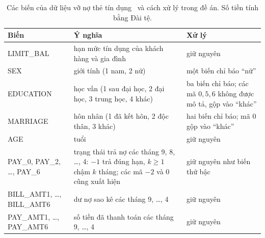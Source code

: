 \begin{table}[ht]
\centering
\caption[Các biến của dữ liệu vỡ nợ thẻ tín dụng]{Các biến của dữ liệu vỡ nợ thẻ tín dụng~\cite{yeh2009} và cách xử lý trong đề án. Số tiền tính bằng Đài tệ.}
\label{tab:credit-vars}
\small
\renewcommand{\arraystretch}{1.2}
\begin{tabularx}{\linewidth}{@{}l X X@{}}
\toprule
\textbf{Biến} & \textbf{Ý nghĩa} & \textbf{Xử lý}\\
\midrule
LIMIT\_BAL & hạn mức tín dụng của khách hàng và gia đình & giữ nguyên\\
SEX & giới tính (1 nam, 2 nữ) & một biến chỉ báo “nữ”\\
EDUCATION & học vấn (1 sau đại học, 2 đại học, 3 trung học, 4 khác) & ba biến chỉ báo; các mã $0,5,6$ không được mô tả, gộp vào “khác”\\
MARRIAGE & hôn nhân (1 đã kết hôn, 2 độc thân, 3 khác) & hai biến chỉ báo; mã $0$ gộp vào “khác”\\
AGE & tuổi & giữ nguyên\\
PAY\_0, PAY\_2, \dots, PAY\_6 & trạng thái trả nợ các tháng 9, 8, \dots, 4: $-1$ trả đúng hạn, $k\ge1$ chậm $k$ tháng; các mã $-2$ và $0$ cũng xuất hiện & giữ nguyên như biến thứ bậc\\
BILL\_AMT1, \dots, BILL\_AMT6 & dư nợ sao kê các tháng 9, \dots, 4 & giữ nguyên\\
PAY\_AMT1, \dots, PAY\_AMT6 & số tiền đã thanh toán các tháng 9, \dots, 4 & giữ nguyên\\
\bottomrule
\end{tabularx}
\end{table}
